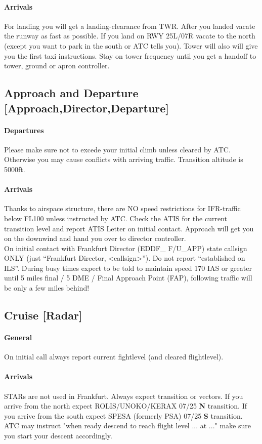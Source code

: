 \paragraph{Arrivals}
For landing you will get a landing-clearance from TWR.
After you landed vacate the runway as fast as possible.
If you land on RWY 25L/07R vacate to the north (except you want to park in the south or ATC tells you).
Tower will also will give you the first taxi instructions.
Stay on tower frequency until you get a handoff to tower, ground or apron controller.

\subsection[APP]{Approach and Departure [Approach,Director,Departure]}
\paragraph{Departures}
Please make sure not to excede your initial climb unless cleared by ATC.
Otherwise you may cause conflicts with arriving traffic.
Transition altitude is 5000ft.

\paragraph{Arrivals}
Thanks to airspace structure, there are NO speed restrictions for IFR-traffic below FL100 unless
instructed by ATC.
Check the ATIS for the current transition level and report ATIS Letter on initial contact.
Approach will get you on the downwind and hand you over to director controller.\\
On initial contact with Frankfurt Director (EDDF\_ F/U\_APP) state callsign ONLY (just “Frankfurt Director, <callsign>”).
Do not report “established on ILS”. During busy times expect to be told to maintain speed 170 IAS or greater until 5 miles final / 5 DME / Final Approach Point (FAP), following traffic will be only a few miles behind!

\subsection[CTR]{Cruise [Radar]}
\paragraph{General}
On initial call always report current fightlevel (and cleared flightlevel).

\paragraph{Arrivals}
STARs are not used in Frankfurt. Always expect transition or vectors.
If you arrive from the north expect ROLIS/UNOKO/KERAX 07/25 \textbf{N} transition.
If you arrive from the south expect SPESA (formerly PSA) 07/25 \textbf{S} transition.
ATC may instruct "when ready descend to reach flight level ... at ..." make sure you start your descent accordingly.

